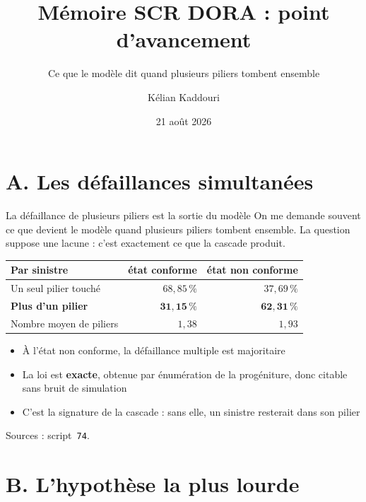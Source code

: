 \documentclass[11pt]{beamer}
\title[Point d'avancement]{Mémoire SCR DORA : point d'avancement}
\subtitle{Ce que le modèle dit quand plusieurs piliers tombent ensemble}
\author[K. Kaddouri]{Kélian Kaddouri}
\institute[ENSAE / Nexialog]{ENSAE / Nexialog Consulting}
\date[21/08/2026]{21 août 2026}
\begin{document}
\begin{frame}
\titlepage
\end{frame}

\section*{A. Les défaillances simultanées}

\begin{frame}{La défaillance de plusieurs piliers est la sortie du modèle}
\small
On me demande souvent ce que devient le modèle quand plusieurs piliers tombent ensemble. La
question suppose une lacune : c'est exactement ce que la cascade produit.
\vspace{3mm}

\begin{center}\small
\begin{tabular}{@{}l r r@{}}
\toprule
\textbf{Par sinistre} & \textbf{état conforme} & \textbf{état non conforme} \\
\midrule
Un seul pilier touché & $68{,}85\,\%$ & $37{,}69\,\%$ \\
\textbf{Plus d'un pilier} & $\mathbf{31{,}15\,\%}$ & $\mathbf{62{,}31\,\%}$ \\
\midrule
Nombre moyen de piliers & $1{,}38$ & $1{,}93$ \\
\bottomrule
\end{tabular}
\end{center}
\vspace{4mm}

\begin{itemize}\itemsep6pt
  \item \alert{À l'état non conforme, la défaillance multiple est majoritaire}
  \item La loi est \textbf{exacte}, obtenue par énumération de la progéniture, donc citable
        sans bruit de simulation
  \item C'est la signature de la cascade : sans elle, un sinistre resterait dans son pilier
\end{itemize}
\vspace{2mm}
{\scriptsize Sources : script~\texttt{74}.}
\end{frame}

\section*{B. L'hypothèse la plus lourde}
\end{document}
